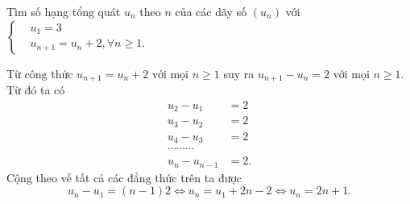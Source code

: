 \begin{bt}%
	Tìm số hạng tổng quát $u_n$ theo $n$ của các dãy số $(u_n)$ với $\left\{\begin{aligned}&u_1=3 \\&u_{n+1}=u_n+2, \forall n\geq 1.\end{aligned}\right.$
	
	\loigiai
	{Từ công thức $u_{n+1}=u_n+2$ với mọi $n\geq 1$ suy ra $u_{n+1}-u_n=2$ với mọi $n\geq 1$. Từ đó ta có
		\allowdisplaybreaks
		\begin{align*}
			u_2-u_1 &= 2\\
			u_3-u_2 &= 2\\
			u_4-u_3 &= 2\\
			\cdots\cdots\cdots\\
			u_{n}-u_{n-1} & =2.
		\end{align*}
		Cộng theo vế tất cả các đẳng thức trên ta được
		\[u_n-u_1 = (n-1)2 \Leftrightarrow u_n = u_1+2n-2 \Leftrightarrow u_n=2n+1.\]
		
	}
\end{bt}

